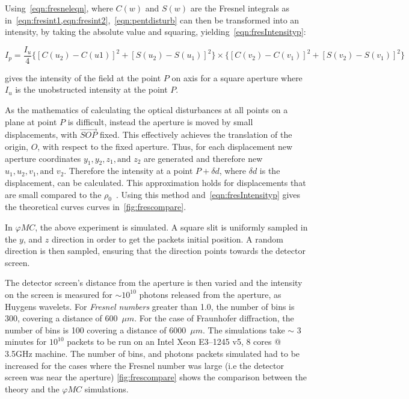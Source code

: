Using~\cref{eqn:fresneleqn}, where $C(w)$ and $S(w)$ are the Fresnel integrals as in~\cref{eqn:fresint1,eqn:fresint2},~\cref{eqn:pentdisturb} can then be transformed into an intensity, by taking the absolute value and squaring, yielding~\cref{eqn:fresIntensityp}:


\begin{equation}
I_p = \frac{I_u}{4} \{[C(u_2) - C(u1)]^2 + [S(u_2) - S(u_1)]^2\} \times \{[C(v_2) - C(v_1)]^2 + [S(v_2) - S(v_1)]^2\}
\label{eqn:fresIntensityp}
\end{equation}

 gives the intensity of the field at the point $P$ on axis for a square aperture where $I_u$ is the unobstructed intensity at the point $P$. 

\medskip

As the mathematics of calculating the optical disturbances at all points on a plane at point $P$ is difficult, instead the aperture is moved by small displacements, with $\overrightarrow{SOP}$ fixed.
This effectively achieves the translation of the origin, $O$, with respect to the fixed aperture. 
Thus, for each displacement new aperture coordinates $y_1, y_2, z_1, \text{and } z_2$ are generated and therefore new $u_1, u_2, v_1, \text{and }v_2$.
Therefore the intensity at a point $P +\delta d$, where $\delta d$ is the displacement, can be calculated.
This approximation holds for displacements that are small compared to the $\rho_0$~\cite{born2000principles,hecht2017optics,goodman2017introduction}.
Using this method and~\cref{eqn:fresIntensityp} gives the theoretical curves curves in~\cref{fig:frescompare}.

\medskip

In $\varphi MC$, the above experiment is simulated. 
A square slit is uniformly sampled in the $y$, and $z$ direction in order to get the packets initial position. 
A random direction is then sampled, ensuring that the direction points towards the detector screen.

The detector screen's distance from the aperture is then varied and the intensity on the screen is measured for $\sim 10^{10}$ photons released from the aperture, as Huygens wavelets.
For \textit{Fresnel numbers} greater than 1.0, the number of bins is 300, covering a distance of 600~$\mu m$. 
For the case of Fraunhofer diffraction, the number of bins is 100 covering a distance of 6000~$\mu m$.
The simulations take $\sim$ 3 minutes for $10^{10}$ packets to be run on an Intel Xeon E3--1245 v5, 8 cores @ 3.5GHz machine.
The number of bins, and photons packets simulated had to be increased for the cases where the Fresnel number was large (i.e the detector screen was near the aperture)
\cref{fig:frescompare} shows the comparison between the theory and the $\varphi MC$ simulations.

